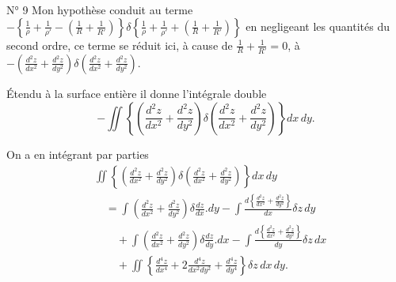 \documentclass[11pt,a4paper]{article}
\begin{document}
N° 9 Mon hypothèse conduit au terme
$-\left\{ \frac{1}{\rho} + \frac{1}{\rho'}
  - \left( \frac{1}{R} + \frac{1}{R'} \right) \right\}
 \delta\left\{ \frac{1}{\rho} + \frac{1}{\rho'}
  + \left( \frac{1}{R} + \frac{1}{R'} \right) \right\}$
en negligeant les quantités du second ordre, ce terme se réduit ici, à cause
de $\frac{1}{R} + \frac{1}{R'} = 0$, à
$-\left( \frac{d^{2}z}{dx^{2}} + \frac{d^{2}z}{dy^{2}} \right)
 \delta\left( \frac{d^{2}z}{dx^{2}} + \frac{d^{2}z}{dy^{2}} \right)$.

Étendu à la surface entière il donne l'intégrale double
\[
  -\iint \left\{ \left( \frac{d^{2}z}{dx^{2}} + \frac{d^{2}z}{dy^{2}} \right)
    \delta\left( \frac{d^{2}z}{dx^{2}} + \frac{d^{2}z}{dy^{2}} \right)
    \right\} dx\, dy .
\]

On a en intégrant par parties
\begin{align*}
  &\iint \left\{ \left( \frac{d^{2}z}{dx^{2}} + \frac{d^{2}z}{dy^{2}} \right)
    \delta\left( \frac{d^{2}z}{dx^{2}} + \frac{d^{2}z}{dy^{2}} \right)
    \right\} dx\, dy \\
  &\quad = \int \left( \frac{d^{2}z}{dx^{2}} + \frac{d^{2}z}{dy^{2}} \right)
      \delta\frac{dz}{dx} . dy
   - \int \frac{d\left\{ \frac{d^{2}z}{dx^{2}} + \frac{d^{2}z}{dy^{2}} \right\}}{dx}
      \delta z\, dy \\
  &\qquad + \int \left( \frac{d^{2}z}{dx^{2}} + \frac{d^{2}z}{dy^{2}} \right)
      \delta\frac{dz}{dy} . dx
   - \int \frac{d\left\{ \frac{d^{2}z}{dx^{2}} + \frac{d^{2}z}{dy^{2}} \right\}}{dy}
      \delta z\, dx \\
  &\qquad + \iint \left\{ \frac{d^{4}z}{dx^{4}}
      + 2\frac{d^{4}z}{dx^{2}dy^{2}} + \frac{d^{4}z}{dy^{4}} \right\}
      \delta z\, dx\, dy .
\end{align*}
\end{document}
